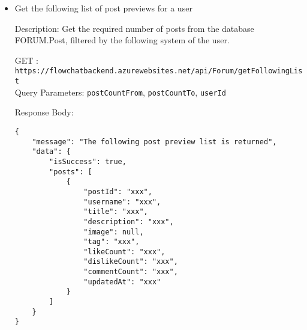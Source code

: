 \documentclass[11pt, a4paper]{article}
\begin{document}
\begin{itemize}
\item Get the following list of post previews for a user

Description: Get the required number of posts from the database FORUM.Post, filtered by the following system of the user. 

GET :  \texttt{https://flowchatbackend.azurewebsites.net/api/Forum/getFollowingList}\\
Query Parameters: \verb|postCountFrom|, \verb|postCountTo|, \verb|userId|
    
Response Body:
    \begin{lstlisting}[breaklines=true, frame=single]
{
    "message": "The following post preview list is returned",
    "data": {
        "isSuccess": true,
        "posts": [
            {
                "postId": "xxx",
                "username": "xxx",
                "title": "xxx",
                "description": "xxx",
                "image": null,
                "tag": "xxx",
                "likeCount": "xxx",
                "dislikeCount": "xxx",
                "commentCount": "xxx",
                "updatedAt": "xxx"
            }
        ]
    }
}
    \end{lstlisting}


\end{itemize}
\end{document}
